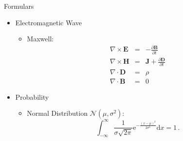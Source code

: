 \documentclass[usepdftitle=false]{beamer}
\begin{document}



\begin{frame}{Formulars}
  \begin{itemize}
    \item Electromagnetic Wave
      \begin{itemize}
        \item Maxwell:
          \begin{eqnarray*}
            \nabla \times \mathbf{E} & = & - \frac{\partial
            \mathbf{B}}{\partial t}\\
            \nabla \times \mathbf{H} & = & \mathbf{J} +
            \frac{\partial \mathbf{D}}{\partial t}\\
            \nabla \cdot \mathbf{D} & = & \rho \\
            \nabla \cdot\mathbf{B} & = & 0
            \label{maxwell}
          \end{eqnarray*}
      \end{itemize}
    \item Probability
      \begin{itemize}
        \item Normal Distribution $\mathcal{N}(\mu,\sigma^2)$:
          \[
          \int_{-\infty}^{\infty}\frac{1}{\sigma\sqrt{2\pi}}\mathrm{e}^{-\frac{(x-\mu)^2}{2\sigma^2}}\mathrm{d}x= 1 \, .
          \]
      \end{itemize}
  \end{itemize}
\end{frame}
\end{document}
